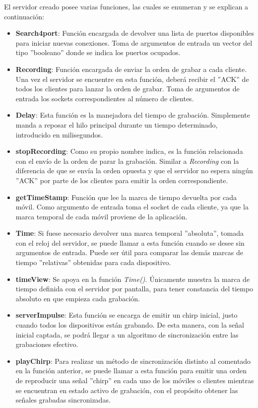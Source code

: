 \documentclass[a4paper,11pt]{book}
\begin{document}
				 El servidor creado posee varias funciones, las cuales se enumeran y se explican a continuación:	 	 
				\begin{itemize}
				\item \textbf{Search4port}: Función encargada de devolver una lista de puertos disponibles para iniciar nuevas conexiones. Toma de argumentos de entrada un vector del tipo ''booleano'' donde se indica los puertos ocupados.
				\item \textbf{Recording}: Función encargada de enviar la orden de grabar a cada cliente. Una vez el servidor se encuentre en esta función, deberá recibir el ''ACK'' de todos los clientes para lanzar la orden de grabar. Toma de argumentos de entrada los sockets correspondientes al número de clientes.
				\item \textbf{Delay}: Esta función es la manejadora del tiempo de grabación. Simplemente manda a reposar el hilo principal durante un tiempo determinado, introducido en milisegundos.
				\item \textbf{stopRecording}: Como su propio nombre indica, es la función relacionada con el envío de la orden de parar la grabación. Similar a \textit{Recording} con la diferencia de que se envía la orden opuesta y que el servidor no espera ningún ''ACK'' por parte de los clientes para emitir la orden correspondiente.
				\item \textbf{getTimeStamp}: Función que lee la marca de tiempo devuelta por cada móvil. Como argumento de entrada toma el socket de cada cliente, ya que la marca temporal de cada móvil proviene de la aplicación.
				\item \textbf{Time}: Si fuese necesario devolver una marca temporal ''absoluta'', tomada con el reloj del servidor, se puede llamar a esta función cuando se desee sin argumentos de entrada. Puede ser útil para comparar las demás marcas de tiempo ''relativas'' obtenidas para cada dispositivo.
				\item \textbf{timeView}: Se apoya en la función \textit{Time()}. Únicamente muestra la marca de tiempo definida con el servidor por pantalla, para tener constancia del tiempo absoluto en que empieza cada grabación.
				\item \textbf{serverImpulse}: Esta función se encarga de emitir un chirp inicial, justo cuando todos los dispositivos están grabando. De esta manera, con la señal inicial captada, se podrá llegar a un algoritmo de sincronización entre las grabaciones efectivo.
				\item \textbf{playChirp}: Para realizar un método de sincronización distinto al comentado en la función anterior, se puede llamar a esta función para emitir una orden de reproducir una señal ''chirp'' en cada uno de los móviles o clientes mientras se encuentran en estado activo de grabación, con el propósito obtener las señales grabadas sincronizadas.

\end{itemize}
\end{document}
